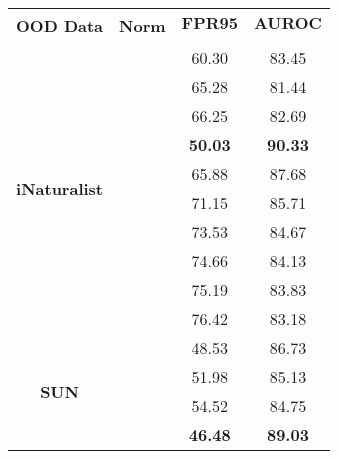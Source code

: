 \documentclass{article}
\begin{document}
\begin{table}[t]
    \centering
\small 
\begin{tabular}{c|c|cc}
\toprule
\multirow{2}{*}{\textbf{OOD Data}}     & \multirow{2}{*}{\textbf{Norm}} & \textbf{FPR95}       & \textbf{AUROC}       \\
                                       &                                & \multicolumn{1}{c}{} & \multicolumn{1}{c}{} \\ \midrule
\multirow{10}{*}{\textbf{iNaturalist}} &                            & 60.30                & 83.45                \\
                                       &                            & 65.28                & 81.44                \\
                                       &                            & 66.25                & 82.69                \\
                                       &                              & \textbf{50.03}       & \textbf{90.33}       \\
                                       &                              & 65.88                & 87.68                \\
                                       &                              & 71.15                & 85.71                \\
                                       &                              & 73.53                & 84.67                \\
                                       &                              & 74.66                & 84.13                \\
                                       &                              & 75.19                & 83.83                \\
                                       &                            & 76.42                & 83.18                \\ \midrule
\multirow{10}{*}{\textbf{SUN}}         &                            & 48.53                & 86.73                \\
                                       &                            & 51.98                & 85.13                \\
                                       &                            & 54.52                & 84.75                \\
                                       &                              & \textbf{46.48}       & \textbf{89.03}       \\

\end{tabular}
\end{table}
\end{document}
